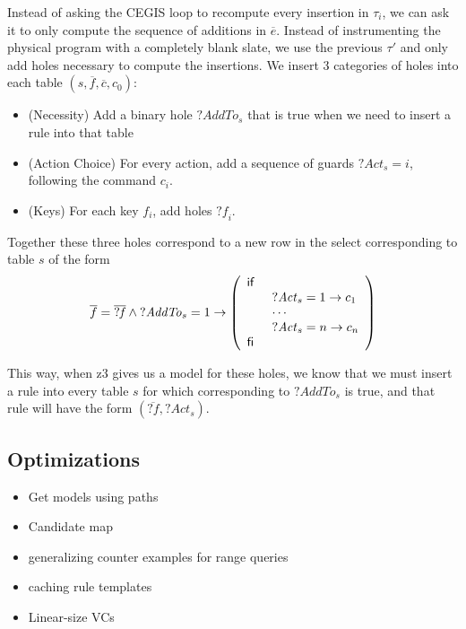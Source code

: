 
Instead of asking the CEGIS loop to recompute every insertion in
$\tau_i$, we can ask it to only compute the sequence of additions in
$\overline{e}$. Instead of instrumenting the physical program with a
completely blank slate, we use the previous $\tau'$ and only add holes
necessary to compute the insertions. We insert 3 categories of holes
into each table $(s, \overline f, \overline c, c_0)$:
\begin{itemize}
\item (Necessity) Add a binary hole $\mathit{?AddTo}_s$ that is true
  when we need to insert a rule into that table
\item (Action Choice) For every action, add a sequence of guards
  $\mathit{?Act}_s = i$, following the command $c_i$.
\item (Keys) For each key $f_i$, add holes $\mathit{?f}_i$.
\end{itemize}

Together these three holes correspond to a new row in the select
corresponding to table $s$ of the form
\[
  \begin{array}l
    \overline{f} = \overline{\mathit{?f}} \wedge \mathit{?AddTo}_s = 1
    \to \left(\begin{array}l \IF \\
          \qquad \mathit{?Act}_s = 1 \to c_1 \\
          \qquad \cdots\\
          \qquad \mathit{?Act}_s = n \to c_n \\
          \ENDIF
        \end{array} \right)
  \end{array}
\]

This way, when z3 gives us a model for these holes, we know that we
must insert a rule into every table $s$ for which corresponding to
$\mathit{?AddTo}_s$ is true, and that rule will have the form
$(\overline{\mathit{?f}}, \mathit{?Act}_s)$.



\subsection{Optimizations}
\begin{itemize}
\item Get models using paths
\item Candidate map
\item generalizing counter examples for range queries
\item caching rule templates
\item Linear-size VCs
\end{itemize}

